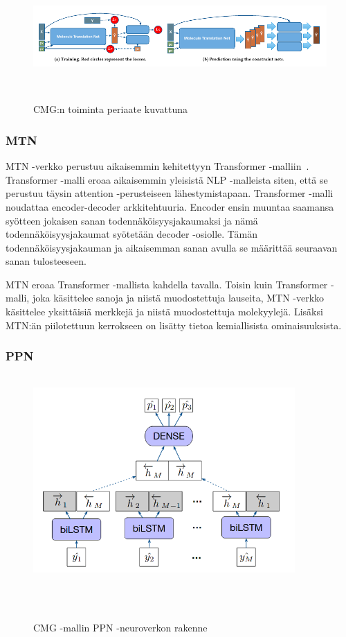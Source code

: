 \documentclass[finnish,twoside,censored,tkt,sw-line]{HYthesisML}
\begin{document}
\begin{figure}[ht]
    \centering
    \includegraphics[width=\textwidth]{CMG-fig.png}
    \caption{CMG:n toiminta periaate kuvattuna}
    {~\cite{ShinBonggun}}
\end{figure}

\subsubsection{MTN}

MTN -verkko perustuu aikaisemmin kehitettyyn Transformer -malliin~\cite{TheTransformer}.
Transformer -malli eroaa aikaisemmin yleisistä NLP -malleista siten, että se perustuu täysin attention -perusteiseen lähestymistapaan.
Transformer -malli noudattaa encoder-decoder arkkitehtuuria.
Encoder ensin muuntaa saamansa syötteen jokaisen sanan todennäköisyysjakaumaksi ja nämä todennäköisyysjakaumat syötetään decoder -osiolle.
Tämän todennäköisyysjakauman ja aikaisemman sanan avulla se määrittää seuraavan sanan tulosteeseen.

MTN eroaa Transformer -mallista kahdella tavalla.
Toisin kuin Transformer -malli, joka käsittelee sanoja ja niistä muodostettuja lauseita, MTN -verkko käsittelee yksittäisiä merkkejä ja niistä muodostettuja molekyylejä.
Lisäksi MTN:än piilotettuun kerrokseen on lisätty tietoa kemiallisista ominaisuuksista.

\subsubsection{PPN}

\begin{figure}[ht]
    \centering
    \includegraphics[width=10cm, height=8cm]{cmg-property-prediction-network.png}
    \caption{CMG -mallin PPN -neuroverkon rakenne}
    {~\cite{ShinBonggun}}
\end{figure}
\end{document}
